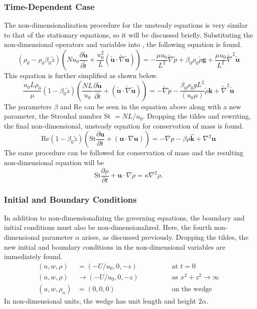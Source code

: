 \documentclass[12pt]{article}
\begin{document}
\subsubsection{Time-Dependent Case}

The non-dimensionalization procedure for the unsteady equations is very similar to that of the stationary equations, so it will be discussed briefly. Substituting the non-dimensional operators and variables into , the following equation is found.
\begin{equation}
(\rho_0-\rho_0\beta_0\tilde{z})\left(Nu_0\frac{\partial\mathbf{\tilde{u}}}{\partial \tilde{t}}+\frac{u_0^2}{L}(\mathbf{\tilde{u}}\cdot\tilde{\nabla}\mathbf{\tilde{u}})\right)=-\frac{\mu u_0}{L^2}\tilde{\nabla}\tilde{p}+\beta_0\rho_0\tilde{\rho}\mathbf{g}+\frac{\mu u_0}{L^2}\tilde{\nabla}^2\mathbf{\tilde{u}}
\end{equation}
This equation is further simplified as shown below.
\begin{equation}
\frac{u_0L\rho_0}{\mu}(1-\beta_0\tilde{z})\left(\frac{NL}{u_0}\frac{\partial\mathbf{\tilde{u}}}{\partial \tilde{t}}+(\mathbf{\tilde{u}}\cdot\tilde{\nabla}\mathbf{\tilde{u}})\right)=-\tilde{\nabla}\tilde{p}-\frac{\beta_0\rho_0gL^2}{(u_0\mu)}\tilde{\rho}\mathbf{\hat{k}}+\tilde{\nabla}^2\mathbf{\tilde{u}}
\end{equation}
The parameters $\beta$ and Re can be seen in the equation above along with a new parameter, the Strouhal number St $=NL/u_0$. Dropping the tildes and rewriting, the final non-dimensional, unsteady equation for conservation of mass is found.
\begin{equation}
\text{Re}(1-\beta_0\tilde{z})\left(\text{St}\frac{\partial\mathbf{u}}{\partial t}+(\mathbf{u}\cdot\nabla\mathbf{u})\right)=-\nabla p-\beta\rho\mathbf{\hat{k}}+\nabla^2\mathbf{u}
\end{equation}
The same procedure can be followed for conservation of mass and the resulting non-dimensional equation will be
\begin{equation}
\text{St}\frac{\partial\rho}{\partial t}+\mathbf{u}\cdot\nabla\rho=\kappa\nabla^2\rho.
\end{equation}
\subsubsection{Initial and Boundary Conditions}
In addition to non-dimensionalizing the governing equations, the boundary and initial conditions must also be non-dimensionalized. Here, the fourth non-dimensional parameter $\alpha$ arises, as discussed previously. Dropping the tildes, the new initial and  boundary conditions in the non-dimensional variables are immediately found.
\begin{align}
(u,w,\rho)&=(-U/u_0,0,-z)\qquad\qquad&\text{at }t=0\\
(u,w,\rho)&\rightarrow(-U/u_0,0,-z)\qquad\qquad&\text{as } x^2+z^2\rightarrow\infty\\
(u,w, \rho_n)&=(0,0,0)&\text{on the wedge}
\end{align}
In non-dimensional units, the wedge has unit length and height $2\alpha$.
\end{document}
